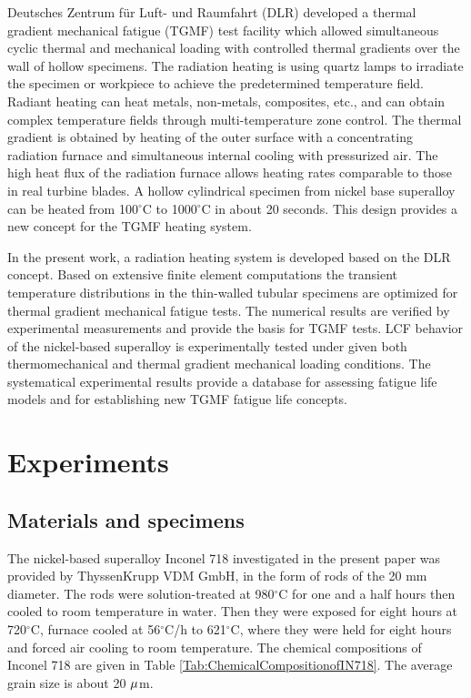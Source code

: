 \documentclass[preprint,5p,twocolumn,10pt,sort&compress]{elsarticle}
\begin{document}
Deutsches Zentrum f\"{u}r Luft- und Raumfahrt (DLR) \cite{BARTSCH2008211, BAUFELD2008219} developed a thermal gradient mechanical fatigue (TGMF) test facility which allowed simultaneous cyclic thermal and mechanical loading with controlled thermal gradients over the wall of hollow specimens. 
The radiation heating is  using quartz lamps to irradiate the specimen or workpiece to achieve the predetermined temperature field. Radiant heating can heat metals, non-metals, composites, etc., and can obtain complex temperature fields through multi-temperature zone control.
The thermal gradient is obtained by heating of the outer surface with a concentrating radiation furnace and simultaneous internal cooling with pressurized air. The high heat flux of the radiation furnace allows heating rates comparable to those in real turbine blades.  A hollow cylindrical specimen from nickel base superalloy can be heated from 100$^\circ$C to 1000$^\circ$C in about 20 seconds. This design provides a new concept for the TGMF heating system.

In the present work, a radiation heating system is developed based on the DLR concept. Based on extensive finite element computations the transient temperature distributions in the thin-walled tubular specimens are optimized for thermal gradient mechanical fatigue tests. The numerical results are verified by experimental measurements and provide the basis for TGMF tests. LCF behavior of the nickel-based superalloy is experimentally tested under given both thermomechanical and thermal gradient mechanical loading conditions. The systematical experimental results provide a database for assessing fatigue life models and for establishing new TGMF fatigue life concepts. 

\section{Experiments}

\subsection{Materials and specimens}
The nickel-based superalloy Inconel 718 investigated in the present paper was provided by ThyssenKrupp VDM GmbH, in the form of rods of the 20 mm diameter.
The rods were solution-treated at 980$^{\circ}$C for one and a half hours then cooled to room temperature in water.
Then they were exposed for eight hours at 720$^{\circ}$C, furnace cooled at 56$^{\circ}$C/h to 621$^{\circ}$C, where they were held for eight hours and forced air cooling to room temperature.
The chemical compositions of Inconel 718 are given in Table \ref{Tab:ChemicalCompositionofIN718}.
The average grain size is about 20 $\rm{\mu }$m.
\end{document}
